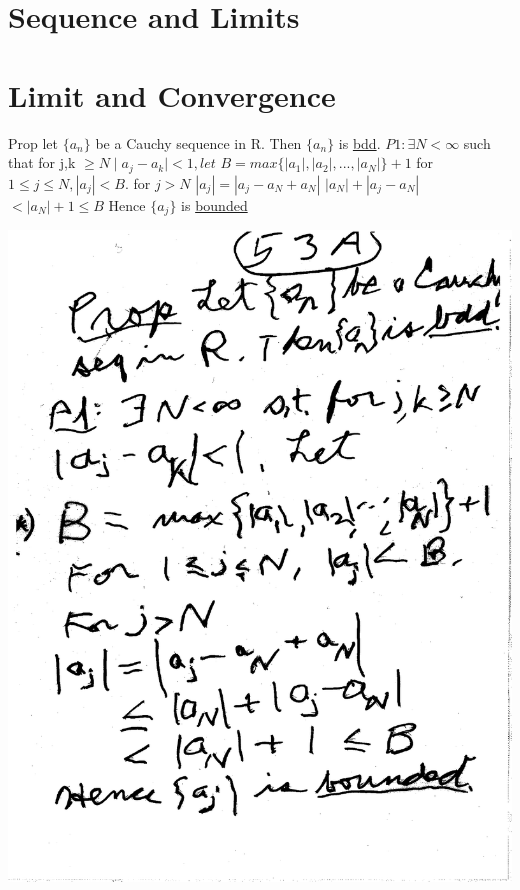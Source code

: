 \documentclass[10pt,a4paper]{article}
\begin{document}



\section{Sequence and Limits}


\section{Limit and Convergence}



Prop let $\{a_n\}$ be a Cauchy sequence in R. Then $\{a_n\}$ is \underline{bdd}.
$P1:\exists N <\infty$ such that for j,k $\geq N \mid a_j - a_k \mid < 1,let$
$B= max \{|a_1|, |a_2|,..., |a_N|\}+1$
for $ 1 \leq j \leq N, |a_j|< B.$
for $ j>N $
$|a_j| = |a_j-a_N+a_N|$
$|a_N| + |a_j-a_N|$
$<|a_N| + 1 \leq B$
Hence $\{a_j\}$ is \underline{bounded}

\includegraphics[scale=.5]{Pages/LC_11}
\end{document}
